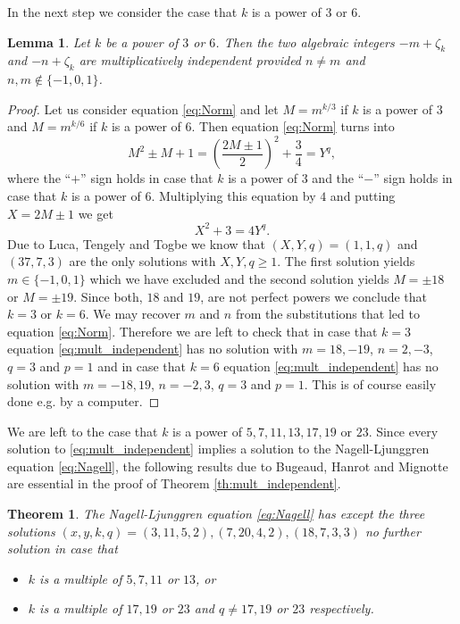 \documentclass{amsart}
\theoremstyle{plain}
\numberwithin{equation}{section}
\newtheorem{theorem}[thm]{Theorem}
\newtheorem{lemma}[thm]{Lemma}
\theoremstyle{remark}
\begin{document}
In the next step we consider the case that $k$ is a power of $3$ or $6$.

\begin{lemma}\label{lem:k=3}
Let $k$ be a power of $3$ or $6$. Then the two algebraic integers $-m+\zeta_k$ and 
$-n+\zeta_k$ are multiplicatively independent provided $n\neq m$ and $n,m\not\in\{-1,0,1\}$.
\end{lemma}

\begin{proof}
  Let us consider equation \eqref{eq:Norm} and let $M=m^{k/3}$ if $k$
  is a power of $3$ and $M=m^{k/6}$ if $k$ is a power of $6$. Then
  equation \eqref{eq:Norm} turns into
  \[M^2\pm M+1=\left(\frac{2M\pm 1}2\right)^2+\frac 34=Y^q,\] where
  the ``$+$'' sign holds in case that $k$ is a power of $3$ and the
  ``$-$'' sign holds in case that $k$ is a power of $6$.  Multiplying
  this equation by $4$ and putting $X=2M\pm 1$ we get
  \[X^2+3=4Y^q.\] Due to Luca, Tengely and Togbe\cite{Luca:2009} we know
  that $(X,Y,q)=(1,1,q)$ and $(37,7,3)$ are the only solutions with
  $X,Y,q\geq 1$. The first solution yields $m\in\{-1,0,1\}$ which we
  have excluded and the second solution yields $M=\pm 18$ or $M=\pm
  19$. Since both, $18$ and $19$, are not perfect powers we conclude
  that $k=3$ or $k=6$.  We may recover $m$ and $n$ from the
  substitutions that led to equation \eqref{eq:Norm}. Therefore we are
  left to check that in case that $k=3$ equation
  \eqref{eq:mult_independent} has no solution with $m=18,-19$,
  $n=2,-3$, $q=3$ and $p=1$ and in case that $k=6$ equation
  \eqref{eq:mult_independent} has no solution with $m=-18,19$,
  $n=-2,3$, $q=3$ and $p=1$. This is of course easily done e.g. by a
  computer.
\end{proof}

We are left to the case that $k$ is a power of $5,7,11,13,17,19$ or
$23$. Since every solution to \eqref{eq:mult_independent} implies a
solution to the Nagell-Ljunggren equation \eqref{eq:Nagell}, the
following results due to Bugeaud, Hanrot and Mignotte \cite[Theorem 1
and 2]{Bugeaud:2002} are essential in the proof of Theorem
\ref{th:mult_independent}.

\begin{theorem}\label{th:Bugeaud}
The Nagell-Ljunggren equation \eqref{eq:Nagell} has except the three solutions $(x,y,k,q)=(3,11,5,2),(7,20,4,2),(18,7,3,3)$ no further solution in case that
 \begin{itemize}
  \item $k$ is a multiple of $5,7,11$ or $13$, or
  \item $k$ is a multiple of $17,19$ or $23$ and $q\neq 17,19$ or $23$ respectively.
 \end{itemize}
\end{theorem}
\end{document}
